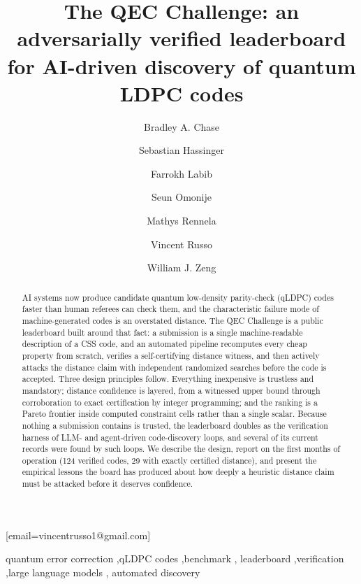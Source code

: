 \documentclass{ceurart}
\begin{document}

\title{The QEC Challenge: an adversarially verified leaderboard for AI-driven
    discovery of quantum LDPC codes}

\author[1]{Bradley A. Chase}
\author[1]{Sebastian Hassinger}
\author[1]{Farrokh Labib}
\author[1]{Seun Omonije}
\author[1]{Mathys Rennela}
\author[1]{Vincent Russo}[email=vincentrusso1@gmail.com]
\author[1,2]{William J. Zeng}
\address[1]{Unitary Foundation}
\address[2]{Quantonation}

\begin{abstract}
    AI systems now produce candidate quantum low-density parity-check (qLDPC)
    codes faster than human referees can check them, and the characteristic
    failure mode of machine-generated codes is an overstated distance. The QEC
    Challenge is a public leaderboard built around that fact: a submission is a
    single machine-readable description of a CSS code, and an automated
    pipeline recomputes every cheap property from scratch, verifies a
    self-certifying distance witness, and then actively attacks the distance
    claim with independent randomized searches before the code is accepted.
    Three design principles follow. Everything inexpensive is trustless and
    mandatory; distance confidence is layered, from a witnessed upper bound
    through corroboration to exact certification by integer programming; and
    the ranking is a Pareto frontier inside computed constraint cells rather
    than a single scalar. Because nothing a submission contains is trusted,
    the leaderboard doubles as the verification harness of LLM- and
    agent-driven code-discovery loops, and several of its current records were
    found by such loops. We describe the design, report on the first months of
    operation (124 verified codes, 29 with exactly certified distance), and
    present the empirical lessons the board has produced about how deeply a
    heuristic distance claim must be attacked before it deserves confidence.
\end{abstract}

\begin{keywords}
    quantum error correction \sep qLDPC codes \sep benchmark \sep
    leaderboard \sep verification \sep large language models \sep
    automated discovery
\end{keywords}
\end{document}
